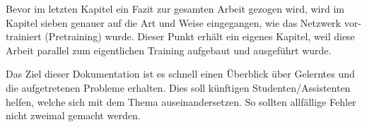 Bevor im letzten Kapitel ein Fazit zur gesamten Arbeit gezogen wird, wird im Kapitel sieben genauer auf die Art und Weise eingegangen, wie das Netzwerk vor-trainiert (Pretraining) wurde. 
Dieser Punkt erhält ein eigenes Kapitel, weil diese Arbeit \grqq{}parallel\grqq{} zum eigentlichen Training aufgebaut und ausgeführt wurde.

Das Ziel dieser Dokumentation ist es schnell einen Überblick über Gelerntes und die aufgetretenen Probleme erhalten.
Dies soll künftigen Studenten/Assistenten helfen, welche sich mit dem Thema auseinandersetzen.
So sollten allfällige Fehler nicht zweimal gemacht werden.

